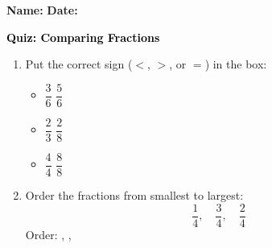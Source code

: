 \documentclass[12pt, letterpaper, fleqn]{article}
\newcommand{\blank}{\underline{\hspace{2.2cm}}}
\begin{document}
\textbf{Name:} \underline{\hspace{5cm}}
\hfill
\textbf{Date:} \underline{\hspace{3cm}}\\

\begin{tcolorbox}[colback=customteal!20]
    \large\textcolor{black}{\textbf{Quiz: Comparing Fractions}}
\end{tcolorbox}

\vspace{5mm}
\begin{enumerate}[itemsep=2cm, leftmargin=0.6cm]
\item Put the correct sign ($<$, $>$, or $=$) in the box:
  \begin{itemize}[itemsep=0.8cm]
    \item $\dfrac{3}{6}$ \quad \blank \quad $\dfrac{5}{6}$
    \item $\dfrac{2}{3}$ \quad \blank \quad $\dfrac{2}{8}$
    \item $\dfrac{4}{4}$ \quad \blank \quad $\dfrac{8}{8}$
  \end{itemize}

\item Order the fractions from smallest to largest:
\[
  \frac{1}{4}, \quad \frac{3}{4}, \quad \frac{2}{4}
\]
Order: \blank, \blank, \blank
\end{enumerate}
\end{document}
